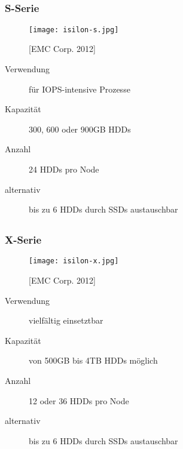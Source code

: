 \documentclass{beamer}
\begin{document}
\subsection{}


\begin{frame}[fragile]
  \frametitle{S-Serie}
  
  \begin{figure}[htp]
    \centering
    \texttt{[image: isilon-s.jpg]}
    \caption{[EMC Corp. 2012]}
  \end{figure}
  
    \begin{description} 
    \item[Verwendung] für IOPS-intensive Prozesse 
    \vspace{5mm}
    \item[Kapazität]300, 600 oder 900GB HDDs
    \item[Anzahl] 24 HDDs pro Node 
    \item[alternativ] bis zu 6 HDDs durch SSDs austauschbar
        
  \end{description}

\end{frame}

\subsection{}
\begin{frame}[fragile]
  \frametitle{X-Serie}
  
  \begin{figure}[htp]
    \centering
    \texttt{[image: isilon-x.jpg]}
    \caption{[EMC Corp. 2012]}
  \end{figure}
  
  \begin{description} 
    \item[Verwendung] vielfältig einsetztbar 
    \vspace{5mm}
    \item[Kapazität] von 500GB bis 4TB HDDs möglich
    \item[Anzahl]  12 oder 36 HDDs pro Node 
    \item[alternativ] bis zu 6 HDDs durch SSDs austauschbar
        
  \end{description}

\end{frame}
\end{document}
